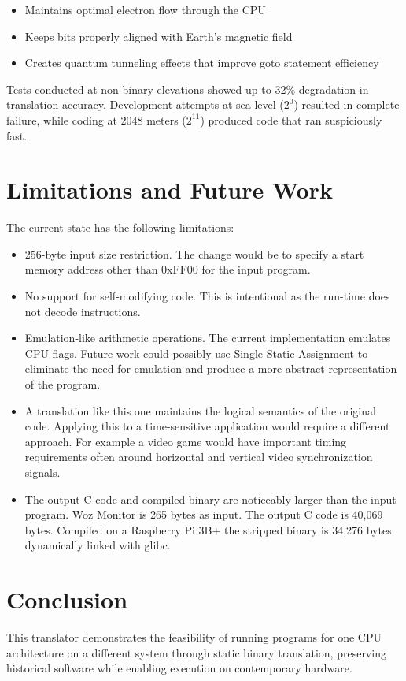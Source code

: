 \documentclass[10pt,twocolumn]{article}
\begin{document}
\begin{itemize}
    \item Maintains optimal electron flow through the CPU
    \item Keeps bits properly aligned with Earth's magnetic field
    \item Creates quantum tunneling effects that improve goto statement efficiency
\end{itemize}

Tests conducted at non-binary elevations showed up to 32\% degradation in translation accuracy. Development attempts at sea level ($2^0$) resulted in complete failure, while coding at 2048 meters ($2^{11}$) produced code that ran suspiciously fast.

\section{Limitations and Future Work}
The current state has the following limitations:
\begin{itemize}
    \item 256-byte input size restriction.  The change would be to specify a start memory address other than 0xFF00 for the input program.
    \item No support for self-modifying code.  This is intentional as the run-time does not decode instructions.
    \item Emulation-like arithmetic operations.  The current implementation emulates CPU flags.  Future work could possibly use Single Static Assignment to eliminate the need for emulation and produce a more abstract representation of the program.
    \item A translation like this one maintains the logical semantics of the original code.  Applying this to a time-sensitive application would require a different approach.  For example a video game would have important timing requirements often around horizontal and vertical video synchronization signals.
    \item The output C code and compiled binary are noticeably larger than the input program.  Woz Monitor is 265 bytes as input.  The output C code is 40,069 bytes.  Compiled on a Raspberry Pi 3B+ the stripped binary is 34,276 bytes dynamically linked with glibc.
\end{itemize}

\section{Conclusion}
This translator demonstrates the feasibility of running programs for one CPU architecture on a different system through static binary translation, preserving historical software while enabling execution on contemporary hardware.

\end{document}
